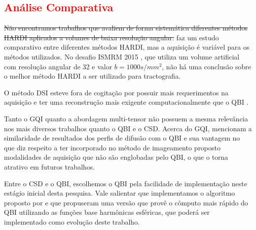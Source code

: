 \documentclass[
    12pt,                %
    oneside,            %
    a4paper,            %
    english,            %
    french,                %
    spanish,            %
    brazil                %
    ]{abntex2}
\begin{document}


\textcolor{red}{\subsection{Análise Comparativa}}



\sout{Não encontramos trabalhos que avaliem de forma sistemática diferentes métodos HARDI aplicados a volumes de baixa resolução angular.}  faz um estudo comparativo entre diferentes métodos HARDI, mas a aquisição é variável para os métodos utilizados. No desafio ISMRM 2015 \cite{TractometerTool}, que utiliza um volume artificial com resolução angular de 32 e valor $b = 1000s/mm^2$, não há uma conclusão sobre  o melhor método HARDI a ser utilizado para tractografia.

O método DSI esteve fora de cogitação por possuir mais requerimentos na aquisição e ter uma reconstrução mais exigente computacionalmente que o QBI \cite{tournier2011}.

Tanto o GQI quanto a abordagem multi-tensor não possuem a mesma relevância nos mais diversos trabalhos quanto o QBI e o CSD. Acerca do GQI,  mencionam a similaridade de resultados dos perfis de difusão com o QBI e sua vantagem no que diz respeito a ter incorporado no método de imageamento proposto modalidades de aquisição que não são englobadas pelo QBI, o que o torna atrativo em futuros trabalhos.

Entre o CSD e o QBI, escolhemos o QBI pela facilidade de implementação neste estágio inicial desta pesquisa. Vale salientar que implementamos o algoritmo proposto por  e que  propuseram uma versão que provê o cômputo mais rápido do QBI utilizando as funções base harmônicas esféricas, que poderá ser implementado como evolução deste trabalho.
\end{document}
